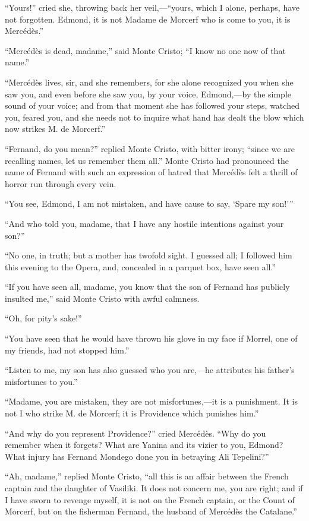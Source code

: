 “Yours!” cried she, throwing back her veil,—“yours, which I alone,
perhaps, have not forgotten. Edmond, it is not Madame de Morcerf who is
come to you, it is Mercédès.”

“Mercédès is dead, madame,” said Monte Cristo; “I know no one now of
that name.”

“Mercédès lives, sir, and she remembers, for she alone recognized you
when she saw you, and even before she saw you, by your voice,
Edmond,—by the simple sound of your voice; and from that moment she has
followed your steps, watched you, feared you, and she needs not to
inquire what hand has dealt the blow which now strikes M. de Morcerf.”

“Fernand, do you mean?” replied Monte Cristo, with bitter irony; “since
we are recalling names, let us remember them all.” Monte Cristo had
pronounced the name of Fernand with such an expression of hatred that
Mercédès felt a thrill of horror run through every vein.

“You see, Edmond, I am not mistaken, and have cause to say, ‘Spare my
son!’”

“And who told you, madame, that I have any hostile intentions against
your son?”

“No one, in truth; but a mother has twofold sight. I guessed all; I
followed him this evening to the Opera, and, concealed in a parquet
box, have seen all.”

“If you have seen all, madame, you know that the son of Fernand has
publicly insulted me,” said Monte Cristo with awful calmness.

“Oh, for pity’s sake!”

“You have seen that he would have thrown his glove in my face if
Morrel, one of my friends, had not stopped him.”

“Listen to me, my son has also guessed who you are,—he attributes his
father’s misfortunes to you.”

“Madame, you are mistaken, they are not misfortunes,—it is a
punishment. It is not I who strike M. de Morcerf; it is Providence
which punishes him.”

“And why do you represent Providence?” cried Mercédès. “Why do you
remember when it forgets? What are Yanina and its vizier to you,
Edmond? What injury has Fernand Mondego done you in betraying Ali
Tepelini?”

“Ah, madame,” replied Monte Cristo, “all this is an affair between the
French captain and the daughter of Vasiliki. It does not concern me,
you are right; and if I have sworn to revenge myself, it is not on the
French captain, or the Count of Morcerf, but on the fisherman Fernand,
the husband of Mercédès the Catalane.”


